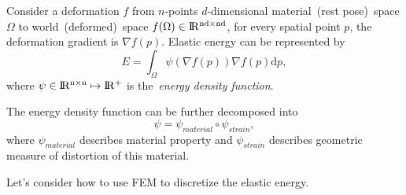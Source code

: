 \documentclass{fancydoc}
\newcommand{\diffd}{\mathrm{d}}
\newcommand{\realR}{\rm I\!R}
\begin{document}
Consider a deformation $f$ from $n$-points $d$-dimensional material~(rest pose)~space $\Omega$ to world~(deformed)~space $f(\Omega) \in \realR^{nd \times nd}$, for every spatial point $p$, the deformation gradient is $\nabla f(p)$.
Elastic energy can be represented by
\begin{equation}\label{sec_FEM_elastic_potential}
E = \int_{\Omega} \psi(\nabla f(p)) \nabla f(p) \diffd p,
\end{equation}
where $\psi \in \realR^{n \times n} \mapsto \realR^+$ is the~\textit{energy density function}.

The energy density function can be further decomposed into
\begin{equation}
\psi = \psi_{material} \circ \psi_{strain},
\end{equation}
where $\psi_{material}$ describes material property and $\psi_{strain}$ describes geometric measure of distortion of this material.

Let's consider how to use FEM to discretize the elastic energy.
\end{document}
